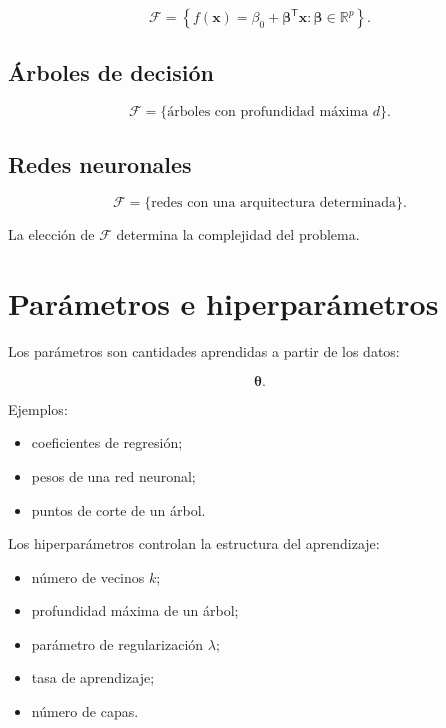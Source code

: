 \documentclass[
  spanish,
  10.5pt,
  letterpaper,
  DIV=11,
  numbers=noendperiod,
  oneside,
  open=any]{scrreprt}
\providecommand{\tightlist}{%
  \setlength{\itemsep}{0pt}\setlength{\parskip}{0pt}}
\theoremstyle{definition}
\theoremstyle{definition}
\theoremstyle{plain}
\theoremstyle{remark}
\begin{document}
\[
\mathcal{F}
=
\left\{
f(\mathbf{x})
=
\beta_0
+
\boldsymbol{\beta}^{\mathsf T}\mathbf{x}
:
\boldsymbol{\beta}\in\mathbb{R}^{p}
\right\}.
\]

\subsection*{Árboles de decisión}\label{uxe1rboles-de-decisiuxf3n}

\[
\mathcal{F}
=
\{
\text{árboles con profundidad máxima }d
\}.
\]

\subsection*{Redes neuronales}\label{redes-neuronales}

\[
\mathcal{F}
=
\{
\text{redes con una arquitectura determinada}
\}.
\]

La elección de \(\mathcal{F}\) determina la complejidad del problema.

\section*{Parámetros e
hiperparámetros}\label{paruxe1metros-e-hiperparuxe1metros}


Los parámetros son cantidades aprendidas a partir de los datos:

\[
\boldsymbol{\theta}.
\]

Ejemplos:

\begin{itemize}
\tightlist
\item
  coeficientes de regresión;
\item
  pesos de una red neuronal;
\item
  puntos de corte de un árbol.
\end{itemize}

Los hiperparámetros controlan la estructura del aprendizaje:

\begin{itemize}
\tightlist
\item
  número de vecinos \(k\);
\item
  profundidad máxima de un árbol;
\item
  parámetro de regularización \(\lambda\);
\item
  tasa de aprendizaje;
\item
  número de capas.
\end{itemize}
\end{document}
